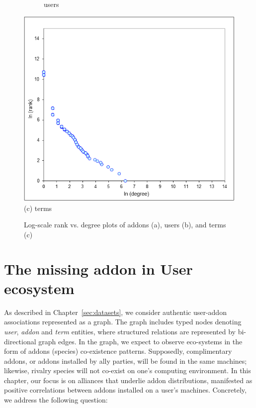 \documentclass[11pt,oneside]{book}
\begin{document}
\begin{figure}[t]
\begin{subfigure}[b]{0.49\textwidth}
\caption{users}
\end{subfigure}
	\centering
\includegraphics[scale=0.48]{figures/zipf-terms.png} \\
(c) terms \\
\caption{Log-scale rank vs. degree plots of addons (a), users (b), and terms (c)}
	\label{fig:zipf}
\end{figure}

\chapter{The missing addon in User ecosystem}
\label{chap:user_ecosystem}

As described in Chapter~\ref{sec:datasets}, we consider authentic user-addon
associations represented as a graph. The graph includes typed nodes
denoting {\it user}, {\it addon} and {\it term} entities, where structured
relations are represented by bi-directional graph edges. In the graph, we expect to observe eco-systems in the form of addons (species) co-existence patterns. 
Supposedly, complimentary addons, or addons installed by ally parties, will be found in the same machines; likewise, rivalry species will not co-exist on one's computing environment. In this chapter, our focus is on alliances that underlie addon distributions, manifested as positive correlations between addons
installed on a user's machines. Concretely, we address the following question:
\end{document}
